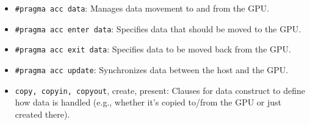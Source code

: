 \begin{itemize}
\item \verb`#pragma acc data`: Manages data movement to and from the GPU.
\item \verb`#pragma acc enter data`: Specifies data that should be moved to the GPU.
\item \verb`#pragma acc exit data`: Specifies data to be moved back from the GPU.
\item \verb`#pragma acc update`: Synchronizes data between the host and the GPU.
\item \verb`copy, copyin, copyout`, create, present: Clauses for data construct to define how data is handled (e.g., whether it's copied to/from the GPU or just created there).
\end{itemize}
